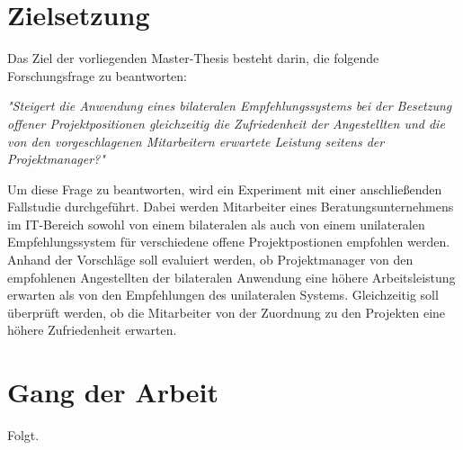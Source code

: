 \section{Zielsetzung}
\label{sec:intro:zielsetzung}
Das Ziel der vorliegenden Master-Thesis besteht darin, die folgende Forschungsfrage zu beantworten:

\textit{"Steigert die Anwendung eines bilateralen Empfehlungssystems bei der Besetzung offener Projektpositionen gleichzeitig die Zufriedenheit der Angestellten und die von den vorgeschlagenen Mitarbeitern erwartete Leistung seitens der Projektmanager?"}

Um diese Frage zu beantworten, wird ein Experiment mit einer anschließenden Fallstudie durchgeführt. Dabei werden Mitarbeiter eines Beratungsunternehmens im IT-Bereich sowohl von einem bilateralen als auch von einem unilateralen Empfehlungssystem für verschiedene offene Projektpostionen empfohlen werden. Anhand der Vorschläge soll evaluiert werden, ob Projektmanager von den empfohlenen Angestellten der bilateralen Anwendung eine höhere Arbeitsleistung erwarten als von den Empfehlungen des unilateralen Systems. Gleichzeitig soll überprüft werden, ob die Mitarbeiter von der Zuordnung zu den Projekten eine höhere Zufriedenheit erwarten.

\section{Gang der Arbeit}
\label{sec:intro:gangDerArbeit}
Folgt.

